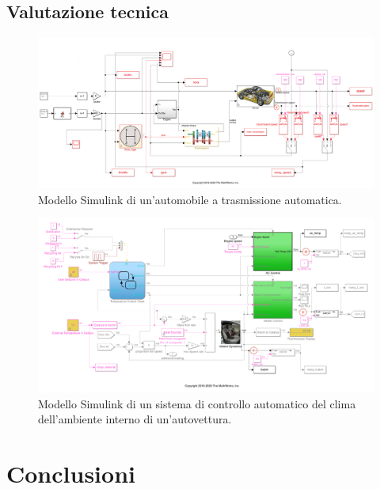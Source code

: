 \documentclass[Lau,binding=0.6cm]{sapthesis}
\begin{document}
\section{Valutazione tecnica}

\begin{figure}
    \includegraphics[scale=0.38]{car.png}
    \centering
    \caption{Modello Simulink di un'automobile a trasmissione automatica.}
    \label{fig:1}
\end{figure}

\begin{figure}
    \includegraphics[scale=0.45]{climate.png}
    \centering
    \caption{Modello Simulink di un sistema di controllo automatico del clima dell'ambiente interno di un'autovettura.}
    \label{fig:2}
\end{figure}

\chapter{Conclusioni}

\backmatter
\end{document}

